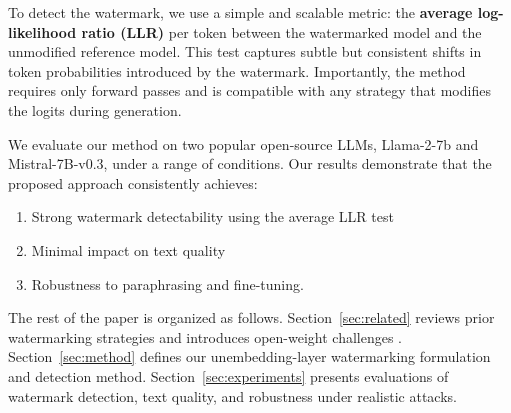 To detect the watermark, we use a simple and scalable metric: the \textbf{average log-likelihood ratio (LLR)} per token between the watermarked model and the unmodified reference model. This test captures subtle but consistent shifts in token probabilities introduced by the watermark. Importantly, the method requires only forward passes and is compatible with any strategy that modifies the logits during generation. 

We evaluate our method on two popular open-source LLMs, Llama-2-7b and Mistral-7B-v0.3, under a range of conditions. Our results demonstrate that the proposed approach consistently achieves:

\begin{enumerate}

    \item Strong watermark detectability using the average LLR test

    \item Minimal impact on text quality

    \item Robustness to paraphrasing and fine-tuning.

\end{enumerate}

The rest of the paper is organized as follows. Section~\ref{sec:related} reviews prior watermarking strategies and introduces open-weight challenges \cite{gloaguen2025towards}. Section~\ref{sec:method} defines our unembedding-layer watermarking formulation and detection method. Section~\ref{sec:experiments} presents evaluations of watermark detection, text quality, and robustness under realistic attacks.